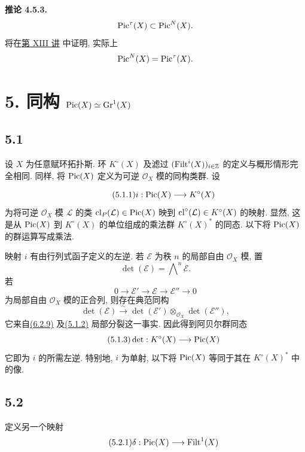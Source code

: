 \textbf{推论 4.5.3.}
\[
\operatorname{Pic}^\tau(X)\subset\operatorname{Pic}^N(X).
\]
将在\hyperlink{sga6.e13.expose}{第 XIII 讲} 中证明, 实际上
\[
\operatorname{Pic}^N(X)=\operatorname{Pic}^\tau(X).
\]

\section*{5. 同构 $\operatorname{Pic}(X)\simeq\operatorname{Gr}^1(X)$}

\subsection*{5.1} 设 $X$ 为任意赋环拓扑斯. 环 $K^\circ(X)$ 及滤过 $(\operatorname{Filt}^i(X))_{i\in\mathbb Z}$ 的定义与概形情形完全相同. 同样, 将 $\operatorname{Pic}(X)$ 定义为可逆 $\mathcal O_X$ 模的同构类群. 设
%
%
%
%

\begin{equation}\tag{5.1.1}
i:\operatorname{Pic}(X)\longrightarrow K^\circ(X)
\end{equation}
为将可逆 $\mathcal O_X$ 模 $\mathcal L$ 的类 $\operatorname{cl}_P(\mathcal L)\in\operatorname{Pic}(X)$ 映到 $\operatorname{cl}^\circ(\mathcal L)\in K^\circ(X)$ 的映射. 显然, 这是从 $\operatorname{Pic}(X)$ 到 $K^\circ(X)$ 的单位组成的乘法群 $K^\circ(X)^*$ 的同态. 以下将 $\operatorname{Pic}(X)$ 的群运算写成乘法.
%
%
%
%
%

映射 $i$ 有由行列式函子定义的左逆. 若 $\mathcal E$ 为秩 $n$ 的局部自由 $\mathcal O_X$ 模, 置
%
\[
\det(\mathcal E)=\bigwedge\nolimits^n\mathcal E.
\]
若
\begin{equation}\tag{5.1.2}
0\longrightarrow\mathcal E'\longrightarrow\mathcal E
\longrightarrow\mathcal E''\longrightarrow0
\end{equation}
为局部自由 $\mathcal O_X$ 模的正合列, 则存在典范同构
%
\[
\det(\mathcal E)\xrightarrow{\sim}
\det(\mathcal E')\otimes_{\mathcal O_X}\det(\mathcal E''),
\]
它来自\hyperlink{sga6.e10.eq.6-2-9}{(6.2.9)} 及\hyperlink{sga6.e10.eq.5-1-2}{(5.1.2)} 局部分裂这一事实. 因此得到阿贝尔群同态
%
\begin{equation}\tag{5.1.3}
\det:K^\circ(X)\longrightarrow\operatorname{Pic}(X)
\end{equation}
它即为 $i$ 的所需左逆. 特别地, $i$ 为单射, 以下将 $\operatorname{Pic}(X)$ 等同于其在 $K^\circ(X)^*$ 中的像.
%

\subsection*{5.2} 定义另一个映射
%
\begin{equation}\tag{5.2.1}
\delta:\operatorname{Pic}(X)\longrightarrow\operatorname{Filt}^1(X)
\end{equation}

